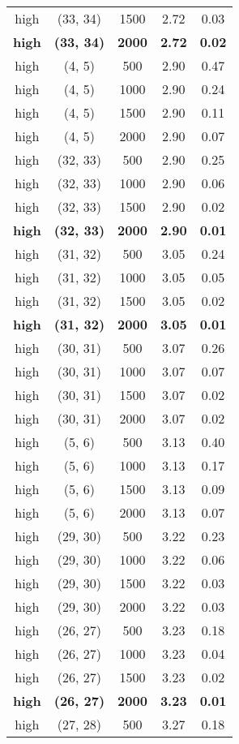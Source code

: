 \begin{tabular}{c c c c c}
high & (33, 34) &  1500 & 2.72 & 0.03 \\
\textbf{high} & \textbf{(33, 34)} & \textbf{ 2000} & \textbf{2.72} & \textbf{0.02} \\
high & (4, 5) &  500 & 2.90 & 0.47 \\
high & (4, 5) &  1000 & 2.90 & 0.24 \\
high & (4, 5) &  1500 & 2.90 & 0.11 \\
high & (4, 5) &  2000 & 2.90 & 0.07 \\
high & (32, 33) &  500 & 2.90 & 0.25 \\
high & (32, 33) &  1000 & 2.90 & 0.06 \\
high & (32, 33) &  1500 & 2.90 & 0.02 \\
\textbf{high} & \textbf{(32, 33)} & \textbf{ 2000} & \textbf{2.90} & \textbf{0.01} \\
high & (31, 32) &  500 & 3.05 & 0.24 \\
high & (31, 32) &  1000 & 3.05 & 0.05 \\
high & (31, 32) &  1500 & 3.05 & 0.02 \\
\textbf{high} & \textbf{(31, 32)} & \textbf{ 2000} & \textbf{3.05} & \textbf{0.01} \\
high & (30, 31) &  500 & 3.07 & 0.26 \\
high & (30, 31) &  1000 & 3.07 & 0.07 \\
high & (30, 31) &  1500 & 3.07 & 0.02 \\
high & (30, 31) &  2000 & 3.07 & 0.02 \\
high & (5, 6) &  500 & 3.13 & 0.40 \\
high & (5, 6) &  1000 & 3.13 & 0.17 \\
high & (5, 6) &  1500 & 3.13 & 0.09 \\
high & (5, 6) &  2000 & 3.13 & 0.07 \\
high & (29, 30) &  500 & 3.22 & 0.23 \\
high & (29, 30) &  1000 & 3.22 & 0.06 \\
high & (29, 30) &  1500 & 3.22 & 0.03 \\
high & (29, 30) &  2000 & 3.22 & 0.03 \\
high & (26, 27) &  500 & 3.23 & 0.18 \\
high & (26, 27) &  1000 & 3.23 & 0.04 \\
high & (26, 27) &  1500 & 3.23 & 0.02 \\
\textbf{high} & \textbf{(26, 27)} & \textbf{ 2000} & \textbf{3.23} & \textbf{0.01} \\
high & (27, 28) &  500 & 3.27 & 0.18 \\

\end{tabular}
